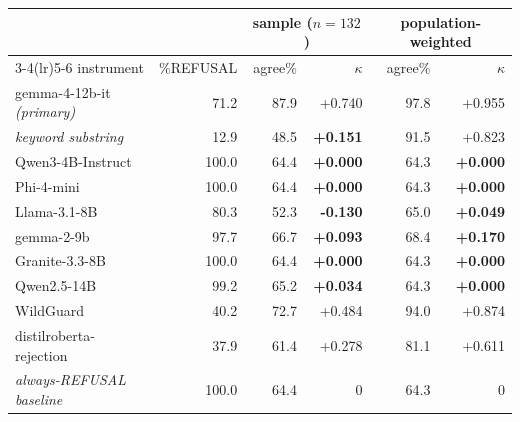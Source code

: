 \setlength{\tabcolsep}{3pt}
\begin{tabular}{@{}l r r r r r@{}}
\toprule
& & \multicolumn{2}{c}{sample ($n{=}132$)} & \multicolumn{2}{c}{population-weighted} \\
\cmidrule(lr){3-4}\cmidrule(lr){5-6}
instrument & \%REFUSAL & agree\% & $\kappa$ & agree\% & $\kappa$ \\
\midrule
gemma-4-12b-it \emph{(primary)} & 71.2 & 87.9 & +0.740 & 97.8 & +0.955 \\
\emph{keyword substring} & 12.9 & 48.5 & \textbf{+0.151} & 91.5 & +0.823 \\
\midrule
Qwen3-4B-Instruct & 100.0 & 64.4 & \textbf{+0.000} & 64.3 & \textbf{+0.000} \\
Phi-4-mini & 100.0 & 64.4 & \textbf{+0.000} & 64.3 & \textbf{+0.000} \\
Llama-3.1-8B & 80.3 & 52.3 & \textbf{-0.130} & 65.0 & \textbf{+0.049} \\
gemma-2-9b & 97.7 & 66.7 & \textbf{+0.093} & 68.4 & \textbf{+0.170} \\
Granite-3.3-8B & 100.0 & 64.4 & \textbf{+0.000} & 64.3 & \textbf{+0.000} \\
Qwen2.5-14B & 99.2 & 65.2 & \textbf{+0.034} & 64.3 & \textbf{+0.000} \\
\midrule
WildGuard & 40.2 & 72.7 & +0.484 & 94.0 & +0.874 \\
distilroberta-rejection & 37.9 & 61.4 & +0.278 & 81.1 & +0.611 \\
\midrule
\emph{always-REFUSAL baseline} & 100.0 & 64.4 & 0 & 64.3 & 0 \\
\bottomrule
\end{tabular}

